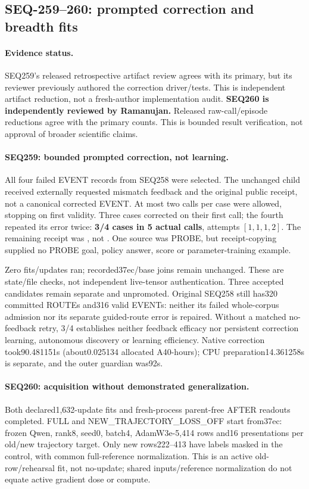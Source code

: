\documentclass[11pt]{article}
\begin{document}
\subsection{SEQ-259--260: prompted correction and breadth fits}
\label{sec:correction-breadth-fit}

\paragraph{Evidence status.}
SEQ259's released retrospective artifact review agrees with its primary, but
its reviewer previously authored the correction driver/tests. This is independent
artifact reduction, not a fresh-author implementation audit. \textbf{SEQ260 is
independently reviewed by Ramanujan.} Released raw-call/episode reductions
agree with the primary counts. This is bounded result verification, not
approval of broader scientific claims.

\paragraph{SEQ259: bounded prompted correction, not learning.}
All four failed EVENT records from SEQ258 were selected. The unchanged child
received externally requested mismatch feedback and the original public receipt,
not a canonical corrected EVENT. At most two calls per case were allowed,
stopping on first validity. Three cases corrected on their first call; the fourth
repeated its error twice: \textbf{3/4 cases in 5 actual calls}, attempts
$[1,1,1,2]$. The remaining receipt was , not
. One source was PROBE, but receipt-copying supplied no PROBE
goal, policy answer, score or parameter-training example.

Zero fits/updates ran; recorded37ec/base joins remain unchanged. These are
state/file checks, not independent live-tensor authentication. Three accepted
candidates remain separate and unpromoted. Original SEQ258 still has320 committed
ROUTEs and316 valid EVENTs: neither its failed whole-corpus admission nor its
separate guided-route error is repaired. Without a matched no-feedback retry,
3/4 establishes neither feedback efficacy nor persistent correction learning,
autonomous discovery or learning efficiency. Native correction took90.481151s
(about0.025134 allocated A40-hours); CPU preparation14.361258s is separate, and
the outer guardian was92s.

\paragraph{SEQ260: acquisition without demonstrated generalization.}
Both declared1,632-update fits and fresh-process parent-free AFTER readouts
completed. FULL and NEW\_TRAJECTORY\_LOSS\_OFF start from37ec: frozen Qwen,
rank8, seed0, batch4, AdamW3e-5,414 rows and16 presentations per old/new
trajectory target. Only new rows222--413 have labels masked in the control,
with common full-reference normalization. This is an active old-row/rehearsal
fit, not no-update; shared inputs/reference normalization do not equate active
gradient dose or compute.
\end{document}
